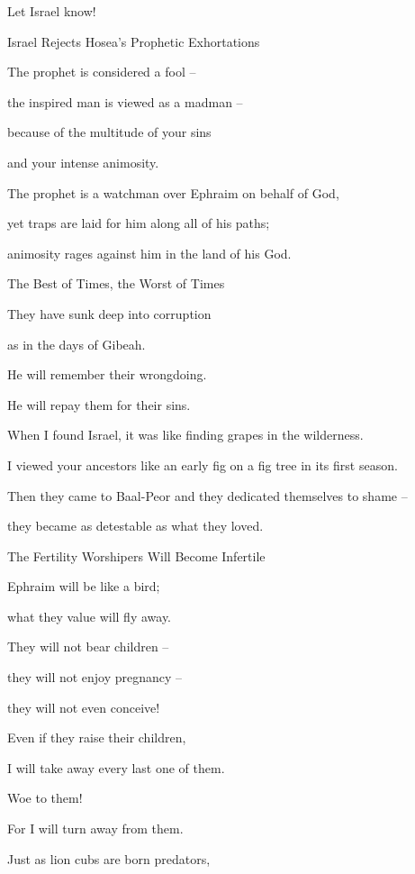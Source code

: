 {\par }{\Q Let Israel
know!
\par }{\SH Israel Rejects Hosea’s Prophetic Exhortations
\par }{\Q The prophet is considered a fool –
\par }{\Q the inspired man is viewed as a madman –
\par }{\Q because of the multitude of your sins
\par }{\Q and your intense animosity.
\par }{\Q {}The prophet
is a watchman
over
Ephraim
on
behalf
of God,
\par }{\Q yet traps
are laid for him along all
of his paths;
\par }{\Q animosity
rages against him
in the land of his God.
\par }{\SH The Best of Times, the Worst of Times
\par }{\Q {}They have sunk deep
into corruption
\par }{\Q as in the days
of Gibeah.
\par }{\Q He will remember
their wrongdoing.
\par }{\Q He will repay them
for their sins.
\par }{\Q {}When I found
Israel,
it was like finding
grapes
in the wilderness.
\par }{\Q I viewed
your ancestors
like an early fig on a fig tree
in its first season.
\par }{\Q Then they
came
to Baal-Peor
and they dedicated
themselves to shame
–
\par }{\Q they became
as detestable
as what they loved.
\par }{\SH The Fertility Worshipers Will Become Infertile
\par }{\Q {}Ephraim
will be like a bird;
\par }{\Q what they value
will fly
away.
\par }{\Q They will not bear children –
\par }{\Q they will not enjoy pregnancy –
\par }{\Q they will not even conceive!
\par }{\Q {}Even
if
they raise
their children,
\par }{\Q I will take away
every last one of them.
\par }{\Q Woe
to them!
\par }{\Q For
I will turn away
from them.
\par }{\Q {}Just as lion cubs are born predators,

}
